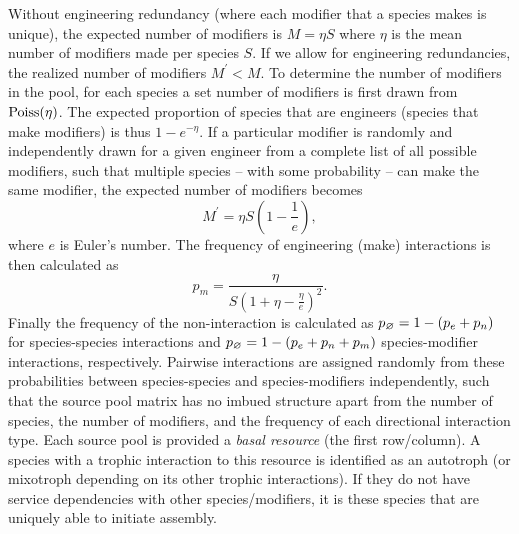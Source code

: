 \documentclass[twocolumn,preprintnumbers,amsmath,amssymb,superscriptaddress,linenumbers]{revtex4-1}
\newcommand{\rr}[1]{{\rm #1}}
\begin{document}
Without engineering redundancy (where each modifier that a species makes is unique), the expected number of modifiers is $M = \eta S$ where $\eta$ is the mean number of modifiers made per species $S$.
If we allow for engineering redundancies, the realized number of modifiers $M^\prime < M$.
To determine the number of modifiers in the pool, for each species a set number of modifiers is first drawn from ${\rm Poiss}(\eta)$.
The expected proportion of species that are engineers (species that make modifiers) is thus $1-{e}^{-\eta}$.
If a particular modifier is randomly and independently drawn for a given engineer from a complete list of all possible modifiers, such that multiple species -- with some probability -- can make the same modifier, the expected number of modifiers becomes
\begin{equation}
M^\prime = \eta S \left(1 - \frac{1}{{e}}\right),
\label{eq:total}
\end{equation}
where $e$ is Euler's number.
The frequency of engineering (make) interactions is then calculated as
\begin{equation}
p_m = \frac{\eta}{S\left(1 + \eta - \frac{\eta}{e}\right)^2}.
\end{equation}
Finally the frequency of the non-interaction is calculated as $p_\rr{\varnothing} = 1 - (p_e + p_n)$ for species-species interactions and $p_\rr{\varnothing} = 1 - (p_e + p_n+ p_m)$ species-modifier interactions, respectively.
Pairwise interactions are assigned randomly from these probabilities between species-species and species-modifiers independently, such that the source pool matrix has no imbued structure apart from the number of species, the number of modifiers, and the frequency of each directional interaction type.
Each source pool is provided a \emph{basal resource} (the first row/column).
A species with a trophic interaction to this resource is identified as an autotroph (or mixotroph depending on its other trophic interactions).
If they do not have service dependencies with other species/modifiers, it is these species that are uniquely able to initiate assembly.
\end{document}
